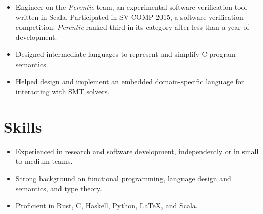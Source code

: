 \documentclass{article}
\begin{document}
\begin{multicols*}{2}
\begin{itemize}[leftmargin=12pt, itemsep=-2pt, topsep=-4pt]
 \item {
  Engineer on the \textit{Perentie} team, an experimental software verification tool written in Scala. Participated in SV COMP 2015, a software verification competition. \textit{Perentie} ranked third in its category after less than a year of development.
 }
 \item {
  Designed intermediate languages to represent and simplify C program semantics.
 }
 \item {
  Helped design and implement an embedded domain-specific language for interacting with SMT solvers.
 }
\end{itemize}

\section*{Skills}

\begin{itemize}[leftmargin=12pt, itemsep=-2pt, topsep=-4pt]
 \item {
  Experienced in research and software development, independently or in small to medium teams.
 }
 \item {
  Strong background on functional programming, language design and semantics, and type theory.
 }
 \item {
  Proficient in Rust, C, Haskell, Python, \LaTeX, and Scala.
 }
\end{itemize}

\end{multicols*}
 
\end{document}

